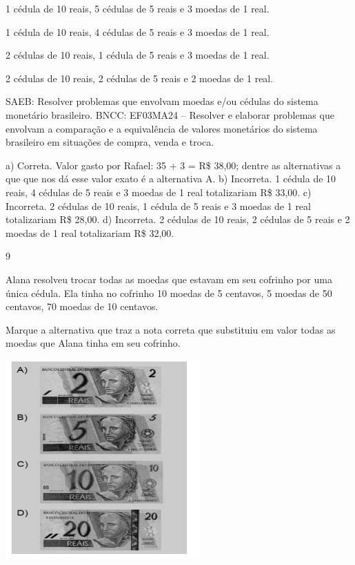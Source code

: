 {\begin{escolha}
{\begin{escolha}
\item
  1 cédula de 10 reais, 5 cédulas de 5 reais e 3 moedas de 1 real.
\item
  1 cédula de 10 reais, 4 cédulas de 5 reais e 3 moedas de 1 real.
\item
  2 cédulas de 10 reais, 1 cédula de 5 reais e 3 moedas de 1 real.
\item
  2 cédulas de 10 reais, 2 cédulas de 5 reais e 2 moedas de 1 real.
\end{escolha}

SAEB: Resolver problemas que envolvam moedas e/ou cédulas do sistema monetário brasileiro.
BNCC: EF03MA24 -- Resolver e elaborar problemas que envolvam a comparação e a equivalência de
valores monetários do sistema brasileiro em situações de compra, venda e troca.

a) Correta. Valor gasto por Rafael: 35 + 3 = R\$ 38,00; dentre as alternativas a que que nos dá esse valor exato é a alternativa A.
b) Incorreta. 1 cédula de 10 reais, 4 cédulas de 5 reais e 3 moedas de 1 real totalizariam R\$ 33,00.
c) Incorreta. 2 cédulas de 10 reais, 1 cédula de 5 reais e 3 moedas de 1 real totalizariam R\$ 28,00.
d) Incorreta. 2 cédulas de 10 reais, 2 cédulas de 5 reais e 2 moedas de 1 real totalizariam R\$ 32,00.

\num{9}

Alana resolveu trocar todas as moedas que estavam em seu cofrinho por uma única cédula. Ela tinha no cofrinho 10 moedas de 5 centavos, 5 moedas de
50 centavos, 70 moedas de 10 centavos.

Marque a alternativa que traz a nota correta que substituiu em valor todas as moedas que Alana tinha em seu cofrinho.


\includegraphics[width=2.93590in,height=3.00930in]{media/image135.png}

}
\end{escolha}}
